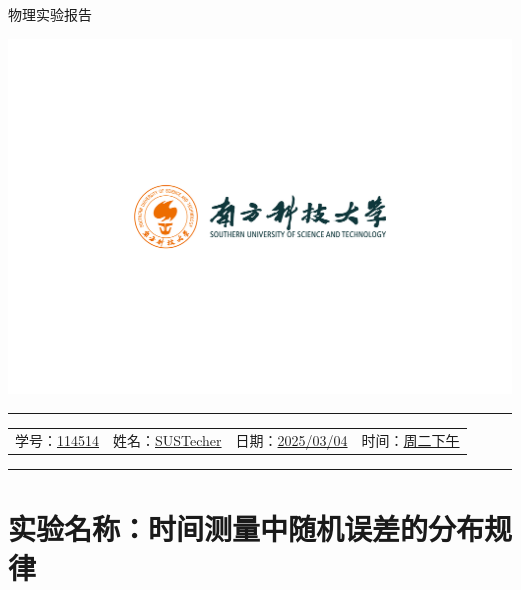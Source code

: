 \documentclass[12pt,a4paper]{article}
\begin{document}
	\noindent
	\hspace{-2em}
	\begin{minipage}[c]{0.65\textwidth}
		\raggedright
		{\fontsize{40pt}{60pt}\selectfont 物理实验报告}
	\end{minipage}
	\begin{minipage}[c]{0.35\textwidth}
		\raggedleft
		\includegraphics[width=\linewidth, trim={20cm 20cm 20cm 20cm}, clip]{university_logo.png}
	\end{minipage}

	\vspace{-1em}
	

	
	\hrule
	\vspace{0.4em}
	\noindent
	\begin{tabular}{l l l l}
    学号：\underline{114514} & 姓名：\underline{SUSTecher} &
    日期：\underline{2025/03/04} & 时间：\underline{周二下午}
	\end{tabular}
	\vspace{-0em}
	\par
	\hrule

	
	\section{实验名称：时间测量中随机误差的分布规律}
	
\end{document}
